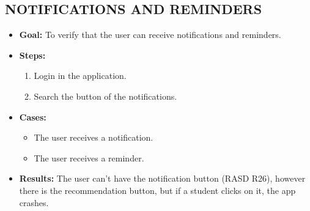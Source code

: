 \subsection{NOTIFICATIONS AND REMINDERS}\label{subsec:notifications-and-reminders}
\begin{itemize}
    \item \textbf{Goal:} To verify that the user can receive notifications and reminders.

    \item \textbf{Steps:}
    \begin{enumerate}
        \item Login in the application.
        \item Search the button of the notifications.
    \end{enumerate}
    \item \textbf{Cases:}
    \begin{itemize}
        \item The user receives a notification.
        \item The user receives a reminder.
    \end{itemize}
    \item \textbf{Results:}
    The user can't have the notification button (RASD R26),
    however there is the recommendation button, but if a student clicks on it, the app crashes.

\end{itemize}

